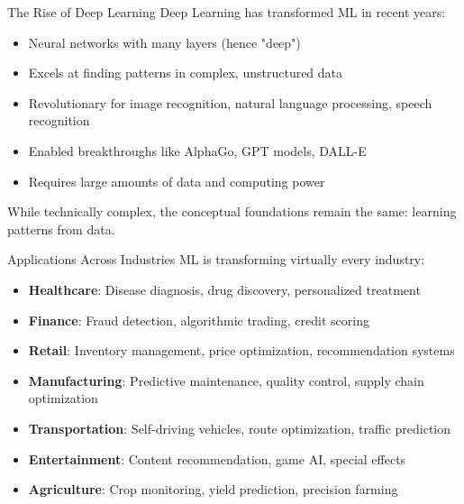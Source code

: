 \documentclass{beamer}
\begin{document}
\begin{frame}{The Rise of Deep Learning}
  Deep Learning has transformed ML in recent years:
  
  \begin{itemize}
    \item Neural networks with many layers (hence "deep")
    \item Excels at finding patterns in complex, unstructured data
    \item Revolutionary for image recognition, natural language processing, speech recognition
    \item Enabled breakthroughs like AlphaGo, GPT models, DALL-E
    \item Requires large amounts of data and computing power
  \end{itemize}
  
  \vspace{0.3cm}
  
  While technically complex, the conceptual foundations remain the same: learning patterns from data.
\end{frame}

\begin{frame}{Applications Across Industries}
  ML is transforming virtually every industry:
  
  \begin{itemize}
    \item \textbf{Healthcare}: Disease diagnosis, drug discovery, personalized treatment
    \item \textbf{Finance}: Fraud detection, algorithmic trading, credit scoring
    \item \textbf{Retail}: Inventory management, price optimization, recommendation systems
    \item \textbf{Manufacturing}: Predictive maintenance, quality control, supply chain optimization
    \item \textbf{Transportation}: Self-driving vehicles, route optimization, traffic prediction
    \item \textbf{Entertainment}: Content recommendation, game AI, special effects
    \item \textbf{Agriculture}: Crop monitoring, yield prediction, precision farming
  \end{itemize}
\end{frame}
\end{document}
